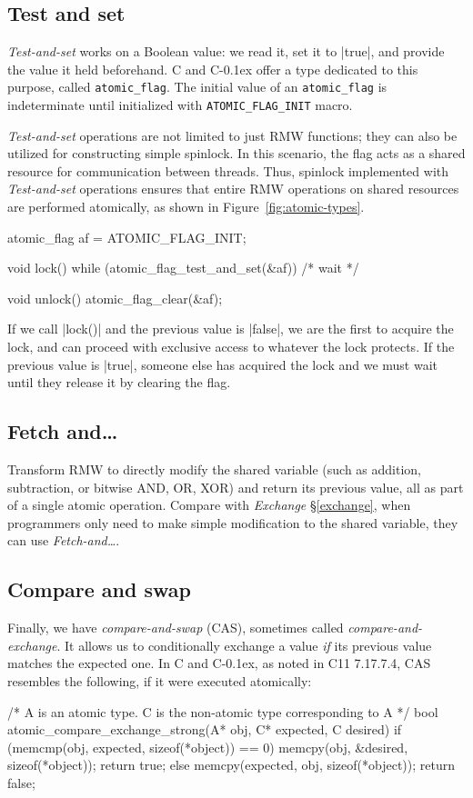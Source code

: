 \documentclass[fontsize=10pt, oneside]{scrartcl}
\newcommand{\monobox}[1]{\mbox{\texttt{#1}}}
\newcommand{\cplusplus}[1]{C\kern-0.1ex\raisebox{0.15ex}{\texttt{++}}}
\newcommand{\clang}[1]{C}
\newcommand{\fig}[1]{Figure~\ref{#1}}
\newcommand{\introduce}[1]{\textit{#1}}
\newcommand{\secref}[1]{\hyperref[#1]{\textsc{\S}\ref*{#1}}}
\begin{document}
\subsection{Test and set}
\label{Testandset}
\introduce{Test-and-set} works on a Boolean value:
we read it, set it to \cpp|true|, and provide the value it held beforehand.
\clang{} and \cplusplus{} offer a type dedicated to this purpose, called \monobox{atomic\_flag}.
The initial value of an \monobox{atomic\_flag} is indeterminate until initialized with \monobox{ATOMIC\_FLAG\_INIT} macro.

\introduce{Test-and-set} operations are not limited to just \textsc{RMW} functions; 
they can also be utilized for constructing simple spinlock. 
In this scenario, the flag acts as a shared resource for communication between threads. 
Thus, spinlock implemented with \introduce{Test-and-set} operations ensures that entire \textsc{RMW} operations on shared resources are performed atomically, as shown in \fig{fig:atomic-types}.
\label{spinlock}
\begin{ccode}
atomic_flag af = ATOMIC_FLAG_INIT;

void lock()
{
    while (atomic_flag_test_and_set(&af)) { /* wait */ }
}

void unlock() { atomic_flag_clear(&af); }
\end{ccode}
If we call \cc|lock()| and the previous value is \cc|false|,
we are the first to acquire the lock,
and can proceed with exclusive access to whatever the lock protects.
If the previous value is \cc|true|,
someone else has acquired the lock and we must wait until they release it by clearing the flag.

\subsection{Fetch and…}
Transform \textsc{RMW} to directly modify the shared variable (such as addition, subtraction,
or bitwise \textsc{AND}, \textsc{OR}, \textsc{XOR}) and return its previous value, 
all as part of a single atomic operation. 
Compare with \introduce{Exchange} \secref{exchange}, when programmers only need to make simple modification to the shared variable, 
they can use \introduce{Fetch-and…}.

\subsection{Compare and swap}
\label{cas}
Finally, we have \introduce{compare-and-swap} (\textsc{CAS}),
sometimes called \introduce{compare-and-exchange}.
It allows us to conditionally exchange a value \emph{if} its previous value matches the expected one.
In \clang{} and \cplusplus{}, as noted in C11 7.17.7.4, \textsc{CAS} resembles the following,
if it were executed atomically:
\begin{ccode}
/* A is an atomic type. C is the non-atomic type corresponding to A */
bool atomic_compare_exchange_strong(A* obj, C* expected, C desired)
{
    if (memcmp(obj, expected, sizeof(*object)) == 0) {
        memcpy(obj, &desired, sizeof(*object));
        return true;
    } else {
        memcpy(expected, obj, sizeof(*object));
        return false;
    }
}
\end{ccode}
\end{document}
